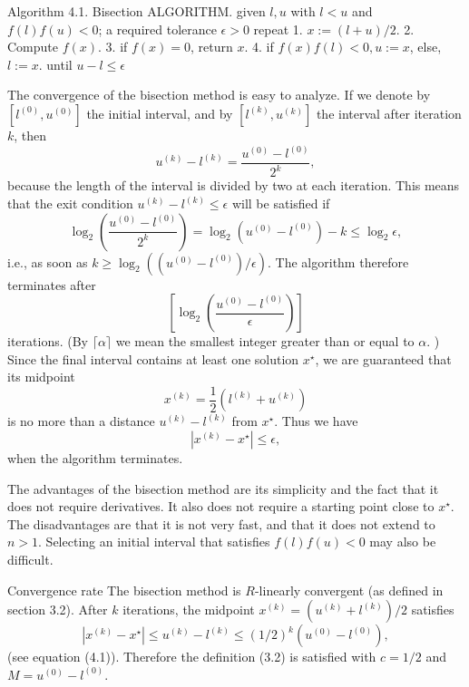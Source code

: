 \begin{algorithm}
    Algorithm 4.1. Bisection ALGORITHM.
given $ l, u $ with $ l<u $ and $ f(l) f(u)<0 $; a required tolerance $ \epsilon>0 $ repeat
1. $ x:=(l+u) / 2 $.
2. Compute $ f(x) $.
3. if $ f(x)=0 $, return $ x $.
4. if $ f(x) f(l)<0, u:=x $, else, $ l:=x $.
until $ u-l \leq \epsilon $
\end{algorithm}

The convergence of the bisection method is easy to analyze. If we denote by $ \left[l^{(0)}, u^{(0)}\right] $ the initial interval, and by $ \left[l^{(k)}, u^{(k)}\right] $ the interval after iteration $ k $, then
\begin{equation}
u^{(k)}-l^{(k)}=\frac{u^{(0)}-l^{(0)}}{2^{k}},
\end{equation}
because the length of the interval is divided by two at each iteration. This means that the exit condition $ u^{(k)}-l^{(k)} \leq \epsilon $ will be satisfied if
\begin{equation}
\log _{2}\left(\frac{u^{(0)}-l^{(0)}}{2^{k}}\right)=\log _{2}\left(u^{(0)}-l^{(0)}\right)-k \leq \log _{2} \epsilon,
\end{equation}
i.e., as soon as $ k \geq \log _{2}\left(\left(u^{(0)}-l^{(0)}\right) / \epsilon\right) $. The algorithm therefore terminates after
\begin{equation}
\left[\log _{2}\left(\frac{u^{(0)}-l^{(0)}}{\epsilon}\right)\right]
\end{equation}
iterations. (By $ \lceil\alpha\rceil $ we mean the smallest integer greater than or equal to $ \alpha . $ )
Since the final interval contains at least one solution $ x^{\star} $, we are guaranteed that its midpoint
\begin{equation}
x^{(k)}=\frac{1}{2}\left(l^{(k)}+u^{(k)}\right)
\end{equation}
is no more than a distance $ u^{(k)}-l^{(k)} $ from $ x^{\star} $. Thus we have
\begin{equation}
\left|x^{(k)}-x^{\star}\right| \leq \epsilon,
\end{equation}
when the algorithm terminates.

The advantages of the bisection method are its simplicity and the fact that it does not require derivatives. It also does not require a starting point close to $ x^{\star} $. The disadvantages are that it is not very fast, and that it does not extend to $ n>1 $. Selecting an initial interval that satisfies $ f(l) f(u)<0 $ may also be difficult.

Convergence rate The bisection method is $ R $-linearly convergent (as defined in section 3.2). After $ k $ iterations, the midpoint $ x^{(k)}=\left(u^{(k)}+l^{(k)}\right) / 2 $ satisfies
\begin{equation}
\left|x^{(k)}-x^{\star}\right| \leq u^{(k)}-l^{(k)} \leq(1 / 2)^{k}\left(u^{(0)}-l^{(0)}\right),
\end{equation}
(see equation (4.1)). Therefore the definition (3.2) is satisfied with $ c=1 / 2 $ and $ M=u^{(0)}-l^{(0)} $.

